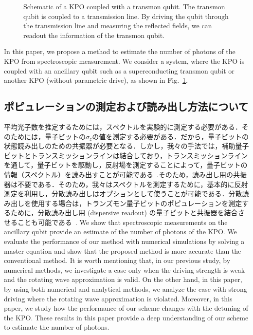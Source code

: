 \begin{figure}%
\centering
\caption{Schematic of a KPO coupled with a transmon qubit.
The transmon qubit is coupled to a transmission line. By driving the qubit through the transmission line and measuring the reflected fields, we can readout the information of the transmon qubit.
}
\label{fig:schematic1}
\end{figure}

In this paper, we propose a method to estimate the number of photons of the KPO from spectroscopic measurement. We consider a system, where the KPO is coupled with an ancillary qubit such as a superconducting transmon qubit or another KPO (without parametric drive), as shown in Fig.~\ref{fig:schematic1}. 

\subsection{ポピュレーションの測定および読み出し方法について}
平均光子数を推定するためには，スペクトルを実験的に測定する必要がある．そのためには，量子ビットの$\hat{\sigma}_z$の値を測定する必要がある．だから，量子ビットの状態読み出しのための共振器が必要となる．しかし，我々の手法では，補助量子ビットとトランスミッションラインは結合しており，トランスミッションラインを通して，量子ビットを駆動し，反射場を測定することによって，量子ビットの情報（スペクトル）を読み出すことが可能である~\cite{astafiev2010resonance,masuda2021theoretical}.そのため，読み出し用の共振器は不要である．そのため，我々はスペクトルを測定するために，基本的に反射測定を利用し，分散読み出しはオプションとして使うことが可能である．分散読み出しを使用する場合は，トランズモン量子ビットのポピュレーションを測定するために，分散読み出し用 (dispersive readout) の量子ビットと共振器を結合させることも可能である~\cite{mallet2009single,walter2017rapid,vijay2011observation}.
We show that spectroscopic measurements on the ancillary qubit provide an estimate of the number of photons of the KPO. We evaluate the performance of our method with numerical simulations by solving a master equation and show that the proposed method is more accurate than the conventional method.
It is worth mentioning that, in our previous study, by numerical methods, we investigate a case only when the driving strength is weak and the rotating wave approximation is valid\cite{2022ssdmkm}.
On the other hand, in this paper, by using both numerical and analytical methods, we analyze the case with strong driving
where the rotating wave approximation is violated. 
Moreover, in this paper, we study how the performance of our scheme changes with the detuning of the KPO.
These results in this paper provide a deep understanding of our scheme to estimate the number of photons.

